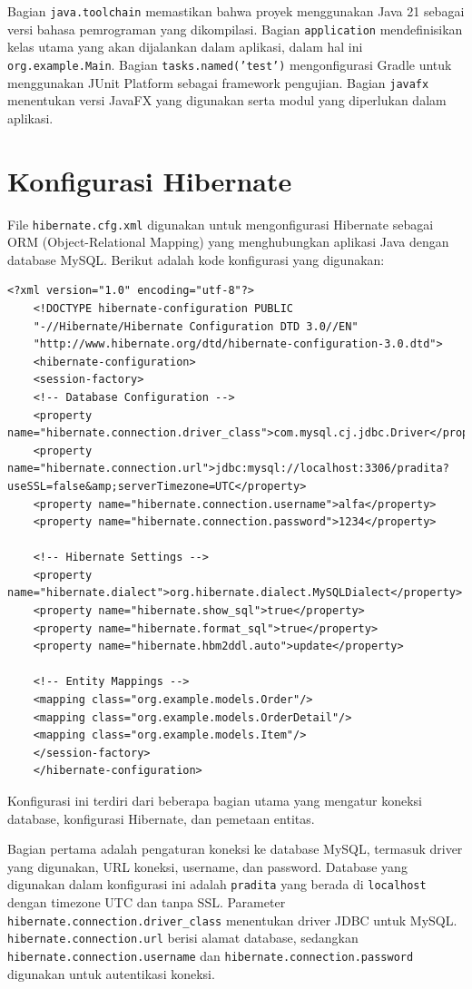 Bagian \texttt{java.toolchain} memastikan bahwa proyek menggunakan Java 21 sebagai versi bahasa pemrograman yang dikompilasi. Bagian \texttt{application} mendefinisikan kelas utama yang akan dijalankan dalam aplikasi, dalam hal ini \texttt{org.example.Main}. Bagian \texttt{tasks.named('test')} mengonfigurasi Gradle untuk menggunakan JUnit Platform sebagai framework pengujian. Bagian \texttt{javafx} menentukan versi JavaFX yang digunakan serta modul yang diperlukan dalam aplikasi.

\section{Konfigurasi Hibernate}

File \texttt{hibernate.cfg.xml} digunakan untuk mengonfigurasi Hibernate sebagai ORM (Object-Relational Mapping) yang menghubungkan aplikasi Java dengan database MySQL. Berikut adalah kode konfigurasi yang digunakan:

\begin{lstlisting}[style=XmlStyle]
	<?xml version="1.0" encoding="utf-8"?>
	<!DOCTYPE hibernate-configuration PUBLIC 
	"-//Hibernate/Hibernate Configuration DTD 3.0//EN"
	"http://www.hibernate.org/dtd/hibernate-configuration-3.0.dtd">
	<hibernate-configuration>
	<session-factory>
	<!-- Database Configuration -->
	<property name="hibernate.connection.driver_class">com.mysql.cj.jdbc.Driver</property>
	<property name="hibernate.connection.url">jdbc:mysql://localhost:3306/pradita?useSSL=false&amp;serverTimezone=UTC</property>
	<property name="hibernate.connection.username">alfa</property>
	<property name="hibernate.connection.password">1234</property>
	
	<!-- Hibernate Settings -->
	<property name="hibernate.dialect">org.hibernate.dialect.MySQLDialect</property>
	<property name="hibernate.show_sql">true</property>
	<property name="hibernate.format_sql">true</property>
	<property name="hibernate.hbm2ddl.auto">update</property>
	
	<!-- Entity Mappings -->
	<mapping class="org.example.models.Order"/>
	<mapping class="org.example.models.OrderDetail"/>
	<mapping class="org.example.models.Item"/>
	</session-factory>
	</hibernate-configuration>
\end{lstlisting}

Konfigurasi ini terdiri dari beberapa bagian utama yang mengatur koneksi database, konfigurasi Hibernate, dan pemetaan entitas.

Bagian pertama adalah pengaturan koneksi ke database MySQL, termasuk driver yang digunakan, URL koneksi, username, dan password. Database yang digunakan dalam konfigurasi ini adalah \texttt{pradita} yang berada di \texttt{localhost} dengan timezone UTC dan tanpa SSL. Parameter \texttt{hibernate.connection.driver\_class} menentukan driver JDBC untuk MySQL. \texttt{hibernate.connection.url} berisi alamat database, sedangkan \texttt{hibernate.connection.username} dan \texttt{hibernate.connection.password} digunakan untuk autentikasi koneksi.

